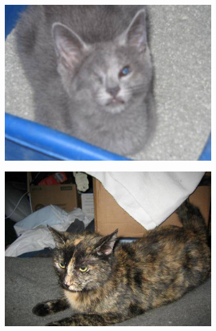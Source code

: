 \begin{figure}[h]
\centering
\begin{subfigure}[b]{.2\linewidth}
\includegraphics[width=\linewidth]{Figs/cat450.jpg}
\end{subfigure}
\begin{subfigure}[b]{.2\linewidth}
\includegraphics[width=\linewidth]{Figs/cat1921.jpg}
\end{subfigure}
\begin{subfigure}[b]{.2\linewidth}

\end{subfigure}
\end{figure}
